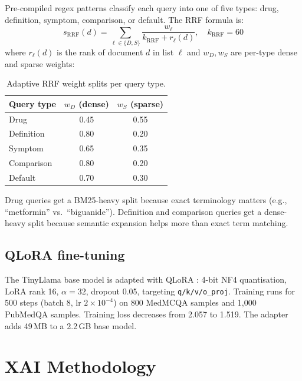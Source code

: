 \documentclass[conference,a4paper]{IEEEtran}
\begin{document}
Pre-compiled regex patterns classify each query into one of five types:
drug, definition, symptom, comparison, or default.
The RRF formula is:
\begin{equation}
  s_{\mathrm{RRF}}(d) = \sum_{\ell \in \{D,S\}} \frac{w_\ell}{k_{\mathrm{RRF}} + r_\ell(d)},
  \quad k_{\mathrm{RRF}} = 60
\end{equation}
where $r_\ell(d)$ is the rank of document $d$ in list $\ell$ and
$w_D, w_S$ are per-type dense and sparse weights:

\begin{table}[h]
\centering
\caption{Adaptive RRF weight splits per query type.}
\label{tab:weights}
\renewcommand{\arraystretch}{1.2}
\begin{tabular}{lcc}
\toprule
\textbf{Query type} & $w_D$ (dense) & $w_S$ (sparse) \\
\midrule
Drug        & 0.45 & 0.55 \\
Definition  & 0.80 & 0.20 \\
Symptom     & 0.65 & 0.35 \\
Comparison  & 0.80 & 0.20 \\
Default     & 0.70 & 0.30 \\
\bottomrule
\end{tabular}
\end{table}

Drug queries get a BM25-heavy split because exact terminology matters
(e.g., ``metformin'' vs.\ ``biguanide'').
Definition and comparison queries get a dense-heavy split because
semantic expansion helps more than exact term matching.

\subsection{QLoRA fine-tuning}

The TinyLlama base model is adapted with QLoRA \cite{dettmers2023qlora}:
4-bit NF4 quantisation, LoRA rank 16, $\alpha = 32$, dropout 0.05,
targeting \texttt{q/k/v/o\_proj}.
Training runs for 500 steps (batch 8, lr $2\times10^{-4}$) on 800
MedMCQA samples and 1,000 PubMedQA samples.
Training loss decreases from 2.057 to 1.519.
The adapter adds 49\,MB to a 2.2\,GB base model.

\section{XAI Methodology}
\label{sec:xai}
\end{document}
